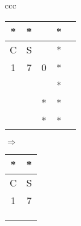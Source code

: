 \documentclass[11pt]{article}
\begin{document}
\begin{tabular}{ccc}
%
\begin{tabular}{|c|c|c|c|c|}
\hline
*  & * &  & *   \\ \hline
C  & S &  & *   \\ \hline
1 &7  & 0 &  *  \\ \hline
  &  &  & *   \\ \hline
  &  & * & *   \\ \hline
  &  & * & *   \\ \hline
\end{tabular}
%
 $\Longrightarrow$
%
\begin{tabular}{|c|c|}
\hline
 * &  *     \\ \hline
 C & S     \\ \hline
1 & 7    \\ \hline
  &      \\ \hline
  &     \\ \hline
  &      \\ \hline
\end{tabular}


\end{tabular}
\end{document}
